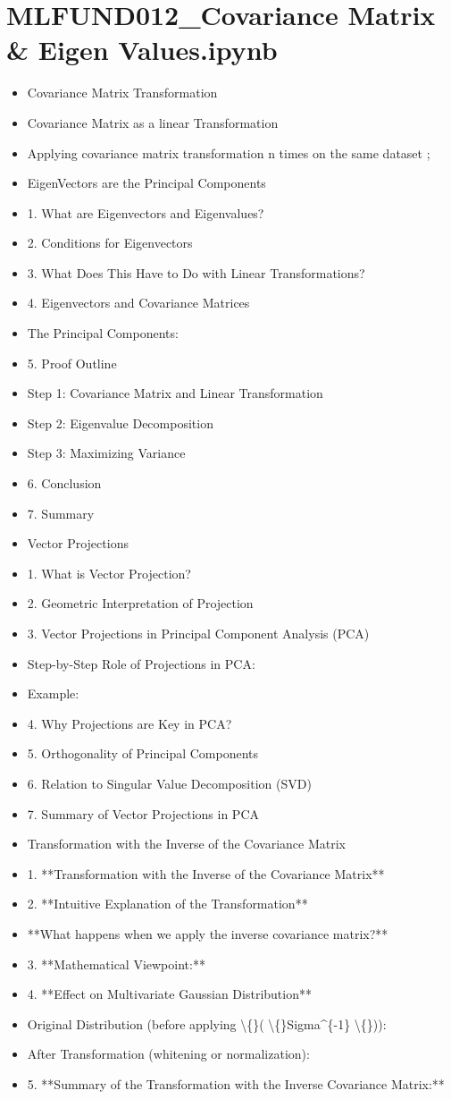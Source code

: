 \documentclass[11pt]{article}
\begin{document}
\section*{MLFUND012\_Covariance Matrix \& Eigen Values.ipynb}
\begin{itemize}
\item Covariance Matrix Transformation
\item Covariance Matrix as a linear Transformation
\item Applying covariance matrix transformation n times on the same dataset ;
\item EigenVectors are the Principal Components
\item 1. What are Eigenvectors and Eigenvalues?
\item 2. Conditions for Eigenvectors
\item 3. What Does This Have to Do with Linear Transformations?
\item 4. Eigenvectors and Covariance Matrices
\item The Principal Components:
\item 5. Proof Outline
\item Step 1: Covariance Matrix and Linear Transformation
\item Step 2: Eigenvalue Decomposition
\item Step 3: Maximizing Variance
\item 6. Conclusion
\item 7. Summary
\item Vector Projections
\item 1. What is Vector Projection?
\item 2. Geometric Interpretation of Projection
\item 3. Vector Projections in Principal Component Analysis (PCA)
\item Step-by-Step Role of Projections in PCA:
\item Example:
\item 4. Why Projections are Key in PCA?
\item 5. Orthogonality of Principal Components
\item 6. Relation to Singular Value Decomposition (SVD)
\item 7. Summary of Vector Projections in PCA
\item Transformation with the Inverse of the Covariance Matrix
\item 1. **Transformation with the Inverse of the Covariance Matrix**
\item 2. **Intuitive Explanation of the Transformation**
\item **What happens when we apply the inverse covariance matrix?**
\item 3. **Mathematical Viewpoint:**
\item 4. **Effect on Multivariate Gaussian Distribution**
\item Original Distribution (before applying \textbackslash\{\}( \textbackslash\{\}Sigma\textasciicircum{}\{-1\} \textbackslash\{\})):
\item After Transformation (whitening or normalization):
\item 5. **Summary of the Transformation with the Inverse Covariance Matrix:**
\end{itemize}
\end{document}

